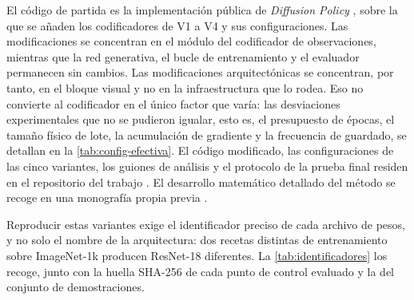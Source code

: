 El c\'odigo de partida es la implementaci\'on p\'ublica de \textit{Diffusion Policy}
\cite{chi2025diffusion}, sobre la que se a\~naden los codificadores de V1 a V4 y sus
configuraciones. Las modificaciones se concentran en el m\'odulo del codificador de
observaciones, mientras que la red generativa, el bucle de entrenamiento y el evaluador
permanecen sin cambios. Las modificaciones arquitect\'onicas se concentran, por tanto, en el
bloque visual y no en la infraestructura que lo rodea. Eso no convierte al codificador en el
\'unico factor que var\'ia: las desviaciones experimentales que no se pudieron igualar, esto
es, el presupuesto de \'epocas, el tama\~no f\'isico de lote, la acumulaci\'on de gradiente y
la frecuencia de guardado, se detallan en la \cref{tab:config-efectiva}. El c\'odigo
modificado, las configuraciones de las cinco variantes, los guiones de an\'alisis y el
protocolo de la
prueba final residen en el repositorio del trabajo \cite{britez2026repo}. El desarrollo
matem\'atico detallado del m\'etodo se recoge en una monograf\'ia propia previa
\cite{britez2026guia}.


Reproducir estas variantes exige el identificador preciso de cada archivo de pesos, y no
solo el nombre de la arquitectura: dos recetas distintas de entrenamiento sobre ImageNet-1k
producen ResNet-18 diferentes. La \cref{tab:identificadores} los recoge, junto con la
huella SHA-256 de cada punto de control evaluado y la del conjunto de demostraciones.

